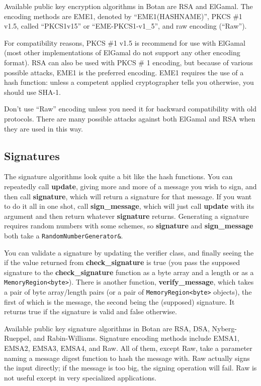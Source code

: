 \documentclass{article}
\newcommand{\function}[1]{\textbf{#1}}
\newcommand{\type}[1]{\texttt{#1}}
\begin{document}
Available public key encryption algorithms in Botan are RSA and ElGamal. The
encoding methods are EME1, denoted by ``EME1(HASHNAME)'', PKCS \#1 v1.5,
called ``PKCS1v15'' or ``EME-PKCS1-v1\_5'', and raw encoding (``Raw'').

For compatibility reasons, PKCS \#1 v1.5 is recommend for use with
ElGamal (most other implementations of ElGamal do not support any
other encoding format). RSA can also be used with PKCS \# 1 encoding,
but because of various possible attacks, EME1 is the preferred
encoding. EME1 requires the use of a hash function: unless a competent
applied cryptographer tells you otherwise, you should use SHA-1.

Don't use ``Raw'' encoding unless you need it for backward
compatibility with old protocols. There are many possible attacks
against both ElGamal and RSA when they are used in this way.

\subsection{Signatures}

The signature algorithms look quite a bit like the hash functions. You
can repeatedly call \function{update}, giving more and more of a
message you wish to sign, and then call \function{signature}, which
will return a signature for that message. If you want to do it all in
one shot, call \function{sign\_message}, which will just call
\function{update} with its argument and then return whatever
\function{signature} returns. Generating a signature requires random
numbers with some schemes, so \function{signature} and
\function{sign\_message} both take a \type{RandomNumberGenerator\&}.

You can validate a signature by updating the verifier class, and finally seeing
the if the value returned from \function{check\_signature} is true (you pass
the supposed signature to the \function{check\_signature} function as a byte
array and a length or as a \type{MemoryRegion<byte>}). There is another
function, \function{verify\_message}, which takes a pair of byte array/length
pairs (or a pair of \type{MemoryRegion<byte>} objects), the first of which is
the message, the second being the (supposed) signature. It returns true if the
signature is valid and false otherwise.

Available public key signature algorithms in Botan are RSA, DSA,
Nyberg-Rueppel, and Rabin-Williams. Signature encoding methods include EMSA1,
EMSA2, EMSA3, EMSA4, and Raw. All of them, except Raw, take a parameter naming
a message digest function to hash the message with. Raw actually signs the
input directly; if the message is too big, the signing operation will fail. Raw
is not useful except in very specialized applications.
\end{document}
